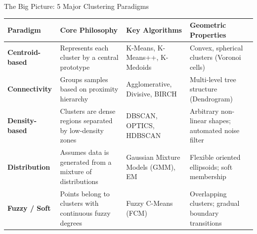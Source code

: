 \documentclass[aspectratio=169,10pt]{beamer}
\begin{document}
\begin{frame}{The Big Picture: 5 Major Clustering Paradigms}
  \begin{table}[]
    \scriptsize
    \centering
    \begin{tabularx}{\textwidth}{l p{2.6cm} p{2.6cm} X}
      \toprule
      \textbf{Paradigm} & \textbf{Core Philosophy} & \textbf{Key Algorithms} & \textbf{Geometric Properties} \\
      \midrule
      \textbf{Centroid-based} & Represents each cluster by a central prototype & K-Means, K-Means++, K-Medoids & Convex, spherical clusters (Voronoi cells) \\
      \addlinespace
      \textbf{Connectivity} & Groups samples based on proximity hierarchy & Agglomerative, Divisive, BIRCH & Multi-level tree structure (Dendrogram) \\
      \addlinespace
      \textbf{Density-based} & Clusters are dense regions separated by low-density zones & DBSCAN, OPTICS, HDBSCAN & Arbitrary non-linear shapes; automated noise filter \\
      \addlinespace
      \textbf{Distribution} & Assumes data is generated from a mixture of distributions & Gaussian Mixture Models (GMM), EM & Flexible oriented ellipsoids; soft membership \\
      \addlinespace
      \textbf{Fuzzy / Soft} & Points belong to clusters with continuous fuzzy degrees & Fuzzy C-Means (FCM) & Overlapping clusters; gradual boundary transitions \\
      \bottomrule
    \end{tabularx}
  \end{table}
\end{frame}
\end{document}
